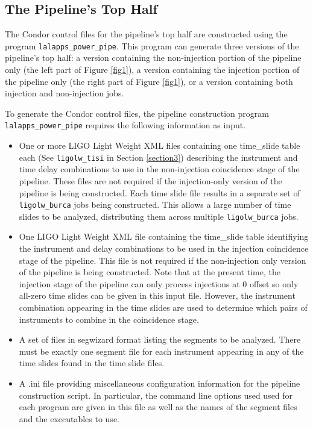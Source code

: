 \documentclass[10pt]{article}
\newcommand{\prog}[1]{\texttt{#1}}
\begin{document}
\subsection{The Pipeline's Top Half}


The Condor control files for the pipeline's top half are constructed using
the program \prog{lalapps\_power\_pipe}.  This program can generate three
versions of the pipeline's top half:  a version containing the
non-injection portion of the pipeline only (the left part of Figure
\ref{fig1}), a version containing the injection portion of the pipeline
only (the right part of Figure \ref{fig1}), or a version containing both
injection and non-injection jobs.

To generate the Condor control files, the pipeline construction program
\prog{lalapps\_power\_pipe} requires the following information as input.
\begin{itemize}
\item One or more LIGO Light Weight XML files containing one time\_slide
table each (See \prog{ligolw\_tisi} in Section \ref{section3}) describing
the instrument and time delay combinations to use in the non-injection
coincidence stage of the pipeline.  These files are not required if the
injection-only version of the pipeline is being constructed.  Each time
slide file results in a separate set of \prog{ligolw\_burca} jobs being
constructed.  This allows a large number of time slides to be analyzed,
distributing them across multiple \prog{ligolw\_burca} jobs.

\item One LIGO Light Weight XML file containing the time\_slide table
identifiying the instrument and delay combinations to be used in the
injection coincidence stage of the pipeline.  This file is not required if
the non-injection only version of the pipeline is being constructed.  Note
that at the present time, the injection stage of the pipeline can only
process injections at 0 offset so only all-zero time slides can be given in
this input file.  However, the instrument combination appearing in the time
slides are used to determine which pairs of instruments to combine in the
coincidence stage.

\item A set of files in segwizard format listing the segments to be
analyzed.  There must be exactly one segment file for each instrument
appearing in any of the time slides found in the time slide files.

\item A .ini file providing miscellaneous configuration information for the
pipeline construction script.  In particular, the command line options used
used for each program are given in this file as well as the names of the
segment files and the executables to use.

\end{itemize}
\end{document}

